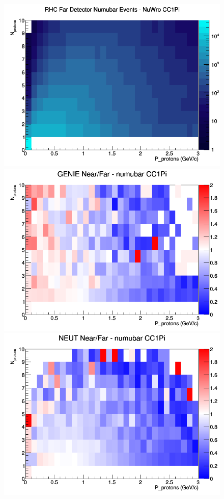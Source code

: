 \begin{figure}[h]
\endminipage
{}
\includegraphics[width=\linewidth]{N_P/nominal/protons/CC1Pi_RHC_FD_numubar_N_P_NuWro.png}
\endminipage
\newline
{}
\includegraphics[width=\linewidth]{N_P/nominal/protons/ratios/CC1Pi_GENIE_numubar_NF_N_P.png}
\endminipage
{}
\includegraphics[width=\linewidth]{N_P/nominal/protons/ratios/CC1Pi_NEUT_numubar_NF_N_P.png}

\end{figure}
